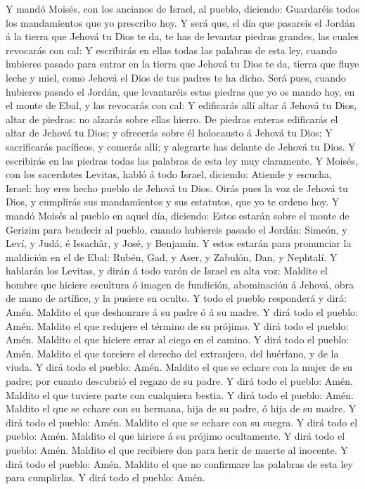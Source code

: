  Y mandó Moisés, con los ancianos de Israel, al pueblo,
diciendo: Guardaréis todos los mandamientos que yo prescribo hoy.
 Y será que, el día que pasareis el Jordán á la tierra que
Jehová tu Dios te da, te has de levantar piedras grandes, las cuales
revocarás con cal:  Y escribirás en ellas todas las palabras
de esta ley, cuando hubieres pasado para entrar en la tierra que Jehová
tu Dios te da, tierra que fluye leche y miel, como Jehová el Dios de tus
padres te ha dicho.  Será pues, cuando hubieres pasado el
Jordán, que levantaréis estas piedras que yo os mando hoy, en el monte
de Ebal, y las revocarás con cal:  Y edificarás allí altar á
Jehová tu Dios, altar de piedras: no alzarás sobre ellas hierro.
 De piedras enteras edificarás el altar de Jehová tu Dios; y
ofrecerás sobre él holocausto á Jehová tu Dios;  Y
sacrificarás pacíficos, y comerás allí; y alegrarte has delante de
Jehová tu Dios.  Y escribirás en las piedras todas las
palabras de esta ley muy claramente.  Y Moisés, con los
sacerdotes Levitas, habló á todo Israel, diciendo: Atiende y escucha,
Israel: hoy eres hecho pueblo de Jehová tu Dios.  Oirás
pues la voz de Jehová tu Dios, y cumplirás sus mandamientos y sus
estatutos, que yo te ordeno hoy.  Y mandó Moisés al pueblo
en aquel día, diciendo:  Estos estarán sobre el monte de
Gerizim para bendecir al pueblo, cuando hubiereis pasado el Jordán:
Simeón, y Leví, y Judá, é Issachâr, y José, y Benjamín.  Y
estos estarán para pronunciar la maldición en el de Ebal: Rubén, Gad, y
Aser, y Zabulón, Dan, y Nephtalí.  Y hablarán los Levitas,
y dirán á todo varón de Israel en alta voz:  Maldito el
hombre que hiciere escultura ó imagen de fundición, abominación á
Jehová, obra de mano de artífice, y la pusiere en oculto. Y todo el
pueblo responderá y dirá: Amén.  Maldito el que deshonrare
á su padre ó á su madre. Y dirá todo el pueblo: Amén. 
Maldito el que redujere el término de su prójimo. Y dirá todo el pueblo:
Amén.  Maldito el que hiciere errar al ciego en el camino.
Y dirá todo el pueblo: Amén.  Maldito el que torciere el
derecho del extranjero, del huérfano, y de la viuda. Y dirá todo el
pueblo: Amén.  Maldito el que se echare con la mujer de su
padre; por cuanto descubrió el regazo de su padre. Y dirá todo el
pueblo: Amén.  Maldito el que tuviere parte con cualquiera
bestia. Y dirá todo el pueblo: Amén.  Maldito el que se
echare con su hermana, hija de su padre, ó hija de su madre. Y dirá todo
el pueblo: Amén.  Maldito el que se echare con su suegra. Y
dirá todo el pueblo: Amén.  Maldito el que hiriere á su
prójimo ocultamente. Y dirá todo el pueblo: Amén.  Maldito
el que recibiere don para herir de muerte al inocente. Y dirá todo el
pueblo: Amén.  Maldito el que no confirmare las palabras de
esta ley para cumplirlas. Y dirá todo el pueblo: Amén.


